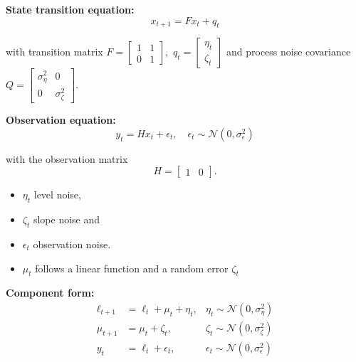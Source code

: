 \medskip
\noindent
\textbf{State transition equation:}
$$x_{t+1} = Fx_t + q_t$$ 

with transition matrix
$F=\begin{bmatrix} 
        1 & 1 \\ 
        0 & 1
    \end{bmatrix},$
$q_t = \begin{bmatrix}
    \eta_t \\ \zeta_t
\end{bmatrix}$
and process noise covariance
$Q=\begin{bmatrix} 
        \sigma^2_\eta & 0 \\ 
        0 & \sigma^2_\zeta 
    \end{bmatrix}.$

\medskip
\noindent     
\textbf{Observation equation:}
$$y_t = Hx_t+\epsilon_t, \quad \epsilon_t \sim \mathcal{N}(0, \sigma^2_\epsilon)$$ 

with the observation matrix \[H=\begin{bmatrix} 1 & 0 \end{bmatrix}.\]

\begin{itemize}
    \item $\eta_t$ level noise, 
    \item $\zeta_t$ slope noise and
    \item $\epsilon_t$ observation noise. 
    \item $\mu_t$ follows a linear function and a random error $\zeta_t$
\end{itemize}

\medskip
\noindent 
\textbf{Component form:}
\begin{align*}
    \ell_{t+1} &= \ell_t + \mu_t + \eta_t, &\eta_t \sim \mathcal{N}(0, \sigma^2_\eta)\\
    \mu_{t+1} &= \mu_t + \zeta_t, &\zeta_t \sim \mathcal{N}(0, \sigma^2_\zeta)\\
    y_t &= \ell_t+\epsilon_t, &\epsilon_t \sim \mathcal{N}(0, \sigma^2_\epsilon)
\end{align*}


